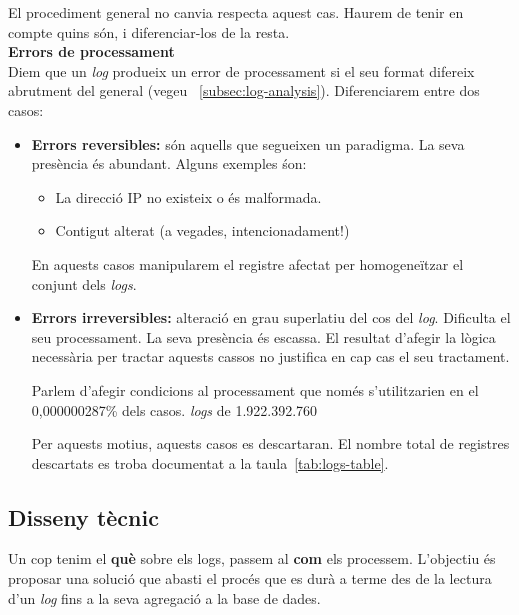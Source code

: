 \noindent
El procediment general no canvia respecta aquest cas.
Haurem de tenir en compte quins són, i diferenciar-los de la resta. \\

\noindent
\textbf{Errors de processament}\label{subsubsection:log-errors} \\

\noindent
Diem que un \textit{log} produeix un error de processament si el seu format difereix abrutment del general (vegeu ~\ref{subsec:log-analysis}).
Diferenciarem entre dos casos:

\begin{itemize}
    \item \textbf{Errors reversibles:} són aquells que segueixen un paradigma.
    La seva presència és abundant.
    Alguns exemples śon:
    \begin{itemize}
        \item La direcció \gls{IP} no existeix o és malformada.
        \item Contigut alterat (a vegades, intencionadament!)
    \end{itemize}
    En aquests casos manipularem el registre afectat per homogeneïtzar el conjunt dels \textit{logs}.
    \item \textbf{Errors irreversibles:} alteració en grau superlatiu del cos del \textit{log}.
    Dificulta el seu processament.
    La seva presència és escassa.
    El resultat d'afegir la lògica necessària per tractar aquests cassos no justifica en cap cas el seu tractament.

    \begin{tcolorbox}[colback=green!5!white, colframe=green!50!black, title=No val la pena]\label{tcbox:no-val-la-pena}
    Parlem d'afegir condicions al processament que només s'utilitzarien en el 0,000000287\% dels casos.
     \textit{logs} de 1.922.392.760
    \end{tcolorbox}

    Per aquests motius, aquests casos es descartaran.
    El nombre total de registres descartats es troba documentat a la taula~\ref{tab:logs-table}.
\end{itemize}

\clearpage

\subsection{Disseny tècnic}\label{subsec:logs-technical-design}

Un cop tenim el \textbf{què} sobre els logs, passem al \textbf{com} els processem.
L'objectiu és proposar una solució que abasti el procés que es durà a terme des de la lectura d’un \textit{log} fins a la seva agregació a la base de dades. \\

